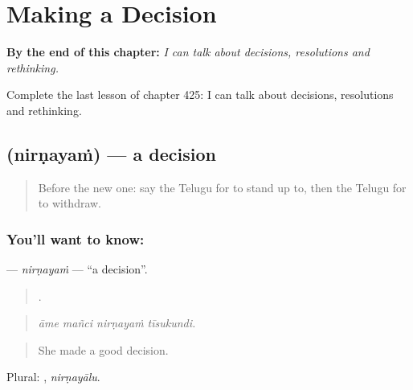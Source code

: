 
\chapter{Making a Decision}
\label{ch:te-making-a-decision}

\begin{chapteropening}
\textbf{By the end of this chapter:} \emph{I can talk about decisions, resolutions and rethinking.}

Complete the last lesson of chapter 425: I can talk about decisions, resolutions and rethinking.
\end{chapteropening}

\section[\texorpdfstring{\te{నిర్ణయం} (nirṇayaṁ)}{నిర్ణయం (nirṇayaṁ)}]{ (nirṇayaṁ) — a decision}

\label{lesson:TE-C425-nirnayam}



\begin{quote}
Before the new one: say the Telugu for to stand up to, then the Telugu for to withdraw.
\end{quote}

\subsection*{You'll want to know: }
\textbf{} — \emph{nirṇayaṁ} — \textquotedblleft{}a decision\textquotedblright{}.

\begin{quote}
   .
\end{quote}

\begin{quote}
\emph{āme mañci nirṇayaṁ tīsukundi.}
\end{quote}

\begin{quote}
She made a good decision.
\end{quote}

Plural: , \emph{nirṇayālu}.


